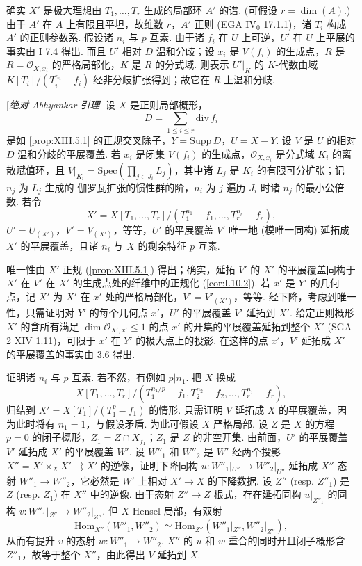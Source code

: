 确实 $X'$ 是极大理想由 $T_1, \ldots, T_r$ 生成的局部环 $A'$ 的谱. (可假设 $r = \dim(A)$.) 由于 $A'$ 在 $A$ 上有限且平坦，故维数 $r$，$A'$ 正则 (EGA IV$_0$ 17.1.1)，诸 $T_i$ 构成 $A'$ 的正则参数系. 假设诸 $n_i$ 与 $p$ 互素. 由于诸 $f_i$ 在 $U$ 上可逆，$U'$ 在 $U$ 上平展的事实由 I 7.4 得出. 而且 $U'$ 相对 $D$ 温和分歧；设 $x_i$ 是 $V(f_i)$ 的生成点，$R$ 是 $R = \mathcal{O}_{X, x_i}$ 的严格局部化，$K$ 是 $R$ 的分式域. 则表示 $U'|_K$ 的 $K$-代数由域 $K[T_i]/(T_i^{n_i} - f_i)$ 经非分歧扩张得到；故它在 $R$ 上温和分歧.

\begin{proposition}\label{prop:XIII.5.2}
[\emph{绝对 Abhyankar 引理}] 设 $X$ 是正则局部概形，
\[
D = \sum_{1 \leqslant i \leqslant r} \mathrm{div}\, f_i
\]
是如 \ref{prop:XIII.5.1} 的正规交叉除子，$Y = \mathrm{Supp}\, D$，$U = X - Y$. 设 $V$ 是 $U$ 的相对 $D$ 温和分歧的平展覆盖. 若 $x_i$ 是闭集 $V(f_i)$ 的生成点，$\mathcal{O}_{X, x_i}$ 是分式域 $K_i$ 的离散赋值环，且 $V|_{K_i} = \mathrm{Spec}(\prod_{j \in J_i} L_j)$，其中诸 $L_j$ 是 $K_i$ 的有限可分扩张；记 $n_j$ 为 $L_j$ 生成的 伽罗瓦扩张的惯性群的阶，$n_i$ 为 $j$ 遍历 $J_i$ 时诸 $n_j$ 的最小公倍数. 若令
\[
X' = X[T_1, \ldots, T_r]/(T_1^{n_1} - f_1, \ldots, T_r^{n_r} - f_r),
\]
$U' = U_{(X')}$，$V' = V_{(X')}$，等等，$U'$ 的平展覆盖 $V'$ 唯一地 (模唯一同构) 延拓成 $X'$ 的平展覆盖，且诸 $n_i$ 与 $X$ 的剩余特征 $p$ 互素.
\end{proposition}

唯一性由 $X'$ 正规 (\cref{prop:XIII.5.1}) 得出；确实，延拓 $V'$ 的 $X'$ 的平展覆盖同构于 $X'$ 在 $V'$ 在 $X'$ 的生成点处的纤维中的正规化 (\cref{cor:I.10.2}). 若 $x'$ 是 $Y'$ 的几何点，记 $X'$ 为 $X'$ 在 $x'$ 处的严格局部化，$V' = V'_{(X')}$，等等. 经下降，考虑到唯一性，只需证明对 $Y'$ 的每个几何点 $x'$，$U'$ 的平展覆盖 $V'$ 延拓到 $X'$. 给定正则概形 $X'$ 的含所有满足 $\dim \mathcal{O}_{X', x'} \leqslant 1$ 的点 $x'$ 的开集的平展覆盖延拓到整个 $X'$ (SGA 2 XIV 1.11)，可限于 $x'$ 在 $Y'$ 的极大点上的投影. 在这样的点 $x'$，$V'$ 延拓成 $X'$ 的平展覆盖的事实由 3.6 得出.

证明诸 $n_i$ 与 $p$ 互素. 若不然，有例如 $p|n_1$. 把 $X$ 换成
\[
X[T_1, \ldots, T_r]/(T_1^{n_1/p} - f_1, T_2^{n_2} - f_2, \ldots, T_r^{n_r} - f_r),
\]
归结到 $X' = X[T_1]/(T_1^p - f_1)$ 的情形. 只需证明 $V$ 延拓成 $X$ 的平展覆盖，因为此时将有 $n_1 = 1$，与假设矛盾. 为此可假设 $X$ 严格局部. 设 $Z$ 是 $X$ 的方程 $p = 0$ 的闭子概形，$Z_1 = Z \cap X_{f_1}$；$Z_1$ 是 $Z$ 的非空开集. 由前面，$U'$ 的平展覆盖 $V'$ 延拓成 $X'$ 的平展覆盖 $W'$. 设 $W''_1$ 和 $W''_2$ 是 $W'$ 经两个投影 $X'' = X' \times_X X' \rightrightarrows X'$ 的逆像，证明下降同构 $u \colon W''_1|_{U''} \to W''_2|_{U''}$ 延拓成 $X''$-态射 $W''_1 \to W''_2$，它必然是 $W'$ 上相对 $X' \to X$ 的下降数据. 设 $Z''$ (resp. $Z''_1$) 是 $Z$ (resp. $Z_1$) 在 $X''$ 中的逆像. 由于态射 $Z'' \to Z$ 根式，存在延拓同构 $u|_{Z''_1}$ 的同构 $v \colon W''_1|_{Z''} \to W''_2|_{Z''}$. 但 $X$ Hensel 局部，有双射
\[
\mathrm{Hom}_{X''}(W''_1, W''_2) \simeq \mathrm{Hom}_{Z''}(W''_1|_{Z''}, W''_2|_{Z''}),
\]
从而有提升 $v$ 的态射 $w \colon W''_1 \to W''_2$. $X''$ 的 $u$ 和 $w$ 重合的同时开且闭子概形含 $Z''_1$，故等于整个 $X''$，由此得出 $V$ 延拓到 $X$.

